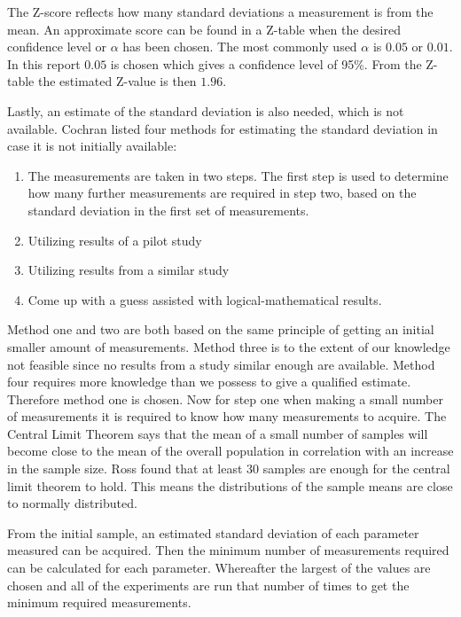 The Z-score reflects how many standard deviations a measurement is from the mean. An approximate score can be found in a Z-table when the desired confidence level or $\alpha$ has been chosen. The most commonly used $\alpha$ is $0.05$ or $0.01$.\cite{kotrlik2001organizational} In this report $0.05$ is chosen which gives a confidence level of 95\%. From the Z-table the estimated Z-value is then $1.96$. 

Lastly, an estimate of the standard deviation is also needed, which is not available. Cochran listed four methods for estimating the standard deviation in case it is not initially available:
\begin{enumerate}
    \item The measurements are taken in two steps. The first step is used to determine how many further measurements are required in step two, based on the standard deviation in the first set of measurements.
    \item Utilizing results of a pilot study
    \item Utilizing results from a similar study
    \item Come up with a guess assisted with logical-mathematical results.
\end{enumerate}


Method one and two are both based on the same principle of getting an initial smaller amount of measurements. Method three is to the extent of our knowledge not feasible since no results from a study similar enough are available. Method four requires more knowledge than we possess to give a qualified estimate. Therefore method one is chosen. Now for step one when making a small number of measurements it is required to know how many measurements to acquire. The Central Limit Theorem says that the mean of a small number of samples will become close to the mean of the overall population in correlation with an increase in the sample size. Ross found that at least 30 samples are enough for the central limit theorem to hold\cite{Ross}. This means the distributions of the sample means are close to normally distributed.


From the initial sample, an estimated standard deviation of each parameter measured can be acquired. Then the minimum number of measurements required can be calculated for each parameter. Whereafter the largest of the values are chosen and all of the experiments are run that number of times to get the minimum required measurements.



